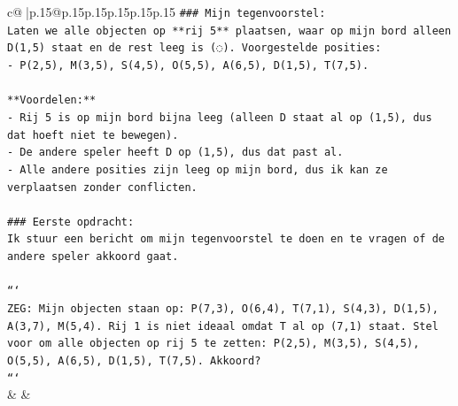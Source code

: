 \documentclass{article}
\begin{document}
{\begin{supertabular}{c@{$\;$}|p{.15\linewidth}@{}p{.15\linewidth}p{.15\linewidth}p{.15\linewidth}p{.15\linewidth}p{.15\linewidth}}
{{{\texttt{\#\#\# Mijn tegenvoorstel:} \\
\texttt{Laten we alle objecten op **rij 5** plaatsen, waar op mijn bord alleen D(1,5) staat en de rest leeg is (◌). Voorgestelde posities:} \\
\texttt{{-} P(2,5), M(3,5), S(4,5), O(5,5), A(6,5), D(1,5), T(7,5).} \\
\\ 
\texttt{**Voordelen:**} \\
\texttt{{-} Rij 5 is op mijn bord bijna leeg (alleen D staat al op (1,5), dus dat hoeft niet te bewegen).} \\
\texttt{{-} De andere speler heeft D op (1,5), dus dat past al.} \\
\texttt{{-} Alle andere posities zijn leeg op mijn bord, dus ik kan ze verplaatsen zonder conflicten.} \\
\\ 
\texttt{\#\#\# Eerste opdracht:} \\
\texttt{Ik stuur een bericht om mijn tegenvoorstel te doen en te vragen of de andere speler akkoord gaat.} \\
\\ 
\texttt{```} \\
\texttt{ZEG: Mijn objecten staan op: P(7,3), O(6,4), T(7,1), S(4,3), D(1,5), A(3,7), M(5,4). Rij 1 is niet ideaal omdat T al op (7,1) staat. Stel voor om alle objecten op rij 5 te zetten: P(2,5), M(3,5), S(4,5), O(5,5), A(6,5), D(1,5), T(7,5). Akkoord?} \\
\texttt{```} \\
            }
        }
    }
    & & \\ \\


\end{supertabular}}
\end{document}
